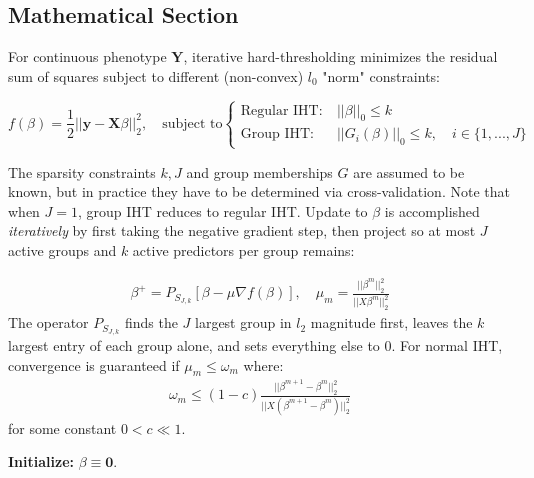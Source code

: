 \documentclass[a0,portrait]{a0poster}
\begin{document}
\begin{multicols}{2}
\subsection*{Mathematical Section}

For continuous phenotype $\mathbf{Y}$, iterative hard-thresholding minimizes the residual sum of squares subject to different (non-convex) $l_0$ "norm" constraints:

\begin{equation}
f(\beta) = \frac{1}{2}||\mathbf{y} - \mathbf{X}\beta||^2_2, \quad \text{subject to} 
\begin{cases}
  \text{Regular IHT:} \ &||\beta||_0 \leq k\\
  \text{Group IHT:} \ &||G_i(\beta)||_0 \leq k, \quad i \in \{1,...,J\}
\end{cases}
\end{equation}

The sparsity constraints $k, J$ and group memberships $G$ are assumed to be known, but in practice they have to be determined via cross-validation. Note that when $J = 1$, group IHT reduces to regular IHT. Update to $\beta$ is accomplished \textit{iteratively} by first taking the negative gradient step, then project so at most $J$ active groups and $k$ active predictors per group remains:

\begin{eqnarray}
\beta^+ = P_{S_{J, k}} \left[\beta - \mu \nabla f(\beta) \right], \quad \mu_m = \frac{||\beta^m||^2_2}{||X\beta^m||^2_2}\label{edgek}
\end{eqnarray}
The operator $P_{S_{J,k}}$ finds the $J$ largest group in $l_2$ magnitude first, leaves the $k$ largest entry of each group alone, and sets everything else to $0$. For normal IHT, convergence is guaranteed if $\mu_m \leq \omega_m$ where:
\begin{eqnarray}
\omega_m \leq (1 - c) \frac{||\beta^{m+1} - \beta^m||_2^2}{||X(\beta^{m+1} - \beta^m)||_2^2}
\end{eqnarray} 
for some constant $0 < c \ll 1$.

\vspace{1cm}

\begin{algorithm*}[H]

    \textbf{Initialize:} $\beta \equiv \mathbf{0}.$\\
    

\end{algorithm*}
\end{multicols}
\end{document}
